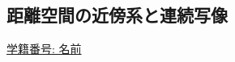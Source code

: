 \documentclass[dvipdfmx,a4paper,11pt]{article}
\theoremstyle{definition}
\begin{document}

 
 \newpage
 
 \begin{center}
\section{距離空間の近傍系と連続写像}
\label{sec-12}
\end{center}
  \begin{flushleft}
{ \large \underline{学籍番号: \hspace{4cm} 名前  \hspace{8.5cm}}}
{\footnotesize }
\end{flushleft}
 
\end{document}
